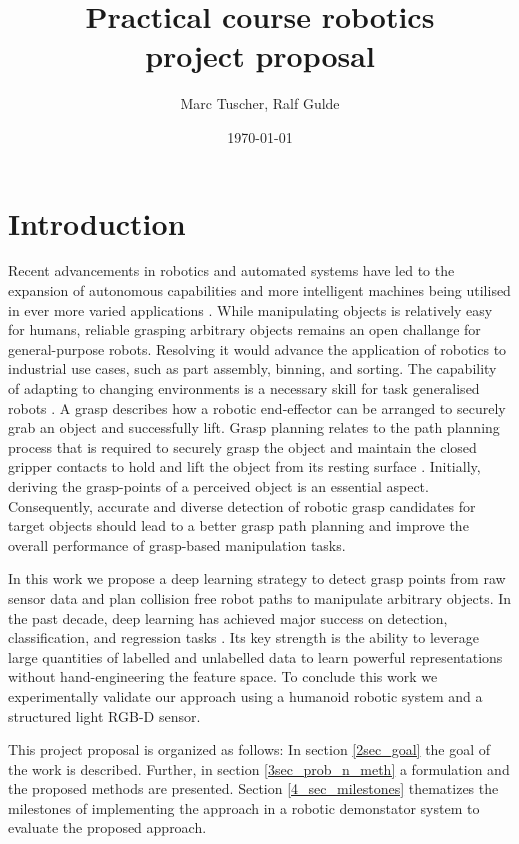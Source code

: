 \documentclass[a4paper]{article}
\title{Practical course robotics \\ project proposal}
\author{Marc Tuscher, Ralf Gulde}
\date{\today}
\begin{document}
\maketitle

\section{Introduction}
Recent advancements in robotics and automated systems have led to the expansion of autonomous capabilities and more intelligent machines being utilised in ever more varied applications \cite{1Visual_learning_2005, 2Teleoperation:2014}.
While manipulating objects is relatively easy for humans, reliable grasping arbitrary objects remains an open challange for general-purpose robots.
Resolving it would advance the application of robotics to industrial use cases, such as part assembly, binning, and sorting.
The capability of adapting to changing environments is a necessary skill for task generalised robots \cite{3Robot_learning_2012, 4Imitation_and_Reinforcement_Learning_2010}.
A grasp describes how a robotic end-effector can be arranged to securely grab an object and successfully lift.
Grasp planning relates to the path planning process that is required to securely grasp the object and maintain the closed gripper contacts to hold and lift the object from its resting surface \cite{5Robotic_grasping_and_contact}.
Initially, deriving the grasp-points of a perceived object is an essential aspect.
Consequently, accurate and diverse detection of robotic grasp candidates for target objects should lead to a better grasp path planning and improve the overall performance of grasp-based manipulation tasks.

In this work we propose a deep learning strategy to detect grasp points from raw sensor data and plan collision free robot paths to manipulate arbitrary objects.
In the past decade, deep learning has achieved major success on detection, classification, and regression tasks \cite{6bo2013unsupervised, 7krizhevsky2012imagenet}. 
Its key strength is the ability to leverage large quantities of labelled and unlabelled data to learn powerful representations without hand-engineering the feature space.
To conclude this work we experimentally validate our approach using a humanoid robotic system and a structured light RGB-D sensor.

This project proposal is organized as follows: In section \ref{2sec_goal} the goal of the work is described. 
Further, in section \ref{3sec_prob_n_meth} a formulation and the proposed methods are presented.
Section \ref{4_sec_milestones} thematizes the milestones of implementing the approach in a robotic demonstator system to evaluate the proposed approach.
\end{document}
